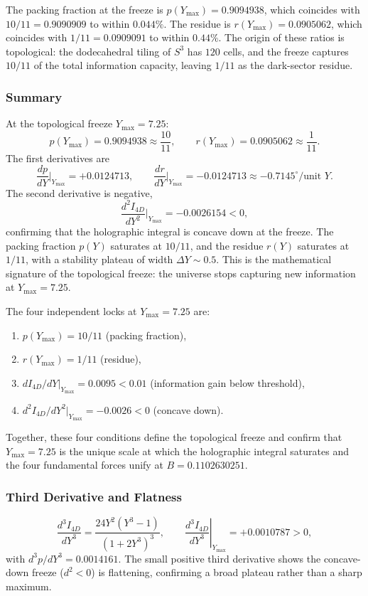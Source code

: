 \documentclass[a4paper,1pt,oneside,openany]{book}
\begin{document}
The packing fraction at the freeze is $p(Y_{\max}) = 0.9094938$, which coincides with $10/11 = 0.9090909$ to within $0.044\%$. The residue is $r(Y_{\max}) = 0.0905062$, which coincides with $1/11 = 0.0909091$ to within $0.44\%$. The origin of these ratios is topological: the dodecahedral tiling of $S^3$ has $120$ cells, and the freeze captures $10/11$ of the total information capacity, leaving $1/11$ as the dark-sector residue.

\subsubsection{Summary}

At the topological freeze $Y_{\max} = 7.25$:
\begin{equation}
\boxed{p(Y_{\max}) = 0.9094938 \approx \frac{10}{11}, \qquad r(Y_{\max}) = 0.0905062 \approx \frac{1}{11}.}
\label{eq:p-r-summary}
\end{equation}
The first derivatives are
\begin{equation}
\boxed{\frac{dp}{dY}\bigg|_{Y_{\max}} = +0.0124713, \qquad \frac{dr}{dY}\bigg|_{Y_{\max}} = -0.0124713 \approx -0.7145^\circ/\text{unit } Y.}
\label{eq:derivative-summary}
\end{equation}
The second derivative is negative,
\begin{equation}
\boxed{\frac{d^2I_{4D}}{dY^2}\bigg|_{Y_{\max}} = -0.0026154 < 0,}
\label{eq:concavity-summary}
\end{equation}
confirming that the holographic integral is concave down at the freeze. The packing fraction $p(Y)$ saturates at $10/11$, and the residue $r(Y)$ saturates at $1/11$, with a stability plateau of width $\Delta Y \sim 0.5$. This is the mathematical signature of the topological freeze: the universe stops capturing new information at $Y_{\max} = 7.25$.

The four independent locks at $Y_{\max} = 7.25$ are:
\begin{enumerate}
\item $p(Y_{\max}) = 10/11$ (packing fraction),
\item $r(Y_{\max}) = 1/11$ (residue),
\item $dI_{4D}/dY|_{Y_{\max}} = 0.0095 < 0.01$ (information gain below threshold),
\item $d^2I_{4D}/dY^2|_{Y_{\max}} = -0.0026 < 0$ (concave down).
\end{enumerate}
Together, these four conditions define the topological freeze and confirm that $Y_{\max} = 7.25$ is the unique scale at which the holographic integral saturates and the four fundamental forces unify at $B = 0.1102630251$.
\subsubsection{Third Derivative and Flatness}
\begin{equation}
\frac{d^3I_{4D}}{dY^3}= \frac{24Y^2(Y^3-1)}{(1+2Y^3)^3},
\qquad \left.\frac{d^3I_{4D}}{dY^3}\right|_{Y_{\max}}=+0.0010787>0,
\end{equation}
with $d^3p/dY^3=0.0014161$. The small positive third derivative 
shows the concave-down freeze ($d^2<0$) is flattening, confirming 
a broad plateau rather than a sharp maximum.
\end{document}
